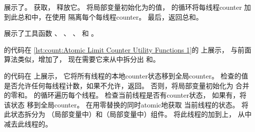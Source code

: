 \begin{listing}

\caption{Atomic Limit Counter读取}
\label{lst:count:Atomic Limit Counter Read}
\end{listing}

\begin{fcvref}
展示了。
获取，
释放它。
将局部变量初始化为的值，
的循环将每线程counter
加到此总和中，在使用
隔离每个每线程counter。
最后，返回总和。
\end{fcvref}

\begin{listing}

\caption{Atomic Limit Counter工具函数1}
\label{lst:count:Atomic Limit Counter Utility Functions 1}
\end{listing}

\begin{listing}

\caption{Atomic Limit Counter工具函数2}
\label{lst:count:Atomic Limit Counter Utility Functions 2}
\end{listing}

展示了工具函数
、
、
、
和
。
\begin{fcvref}
的代码在
\cref{lst:count:Atomic Limit Counter Utility Functions 1}的
上展示，
与前面算法类似，增加了，
现在需要它来从中拆分出
和。
\end{fcvref}

\begin{fcvref}
的代码在
上展示，
它将所有线程的本地counter状态移到全局counter。
检查的值
是否允许任何每线程计数，如果不允许，返回。
否则，将局部变量初始化为
合并的零和。
的循环遍历每个线程。
检查当前线程是否有counter状态，
如果有，将该状态
移到全局counter。
在用零替换的同时atomic地获取
当前线程的状态。
将此状态拆分为
（局部变量中）和（局部变量中）组件。
将此线程的加到上，
从中减去此线程的。
\end{fcvref}

